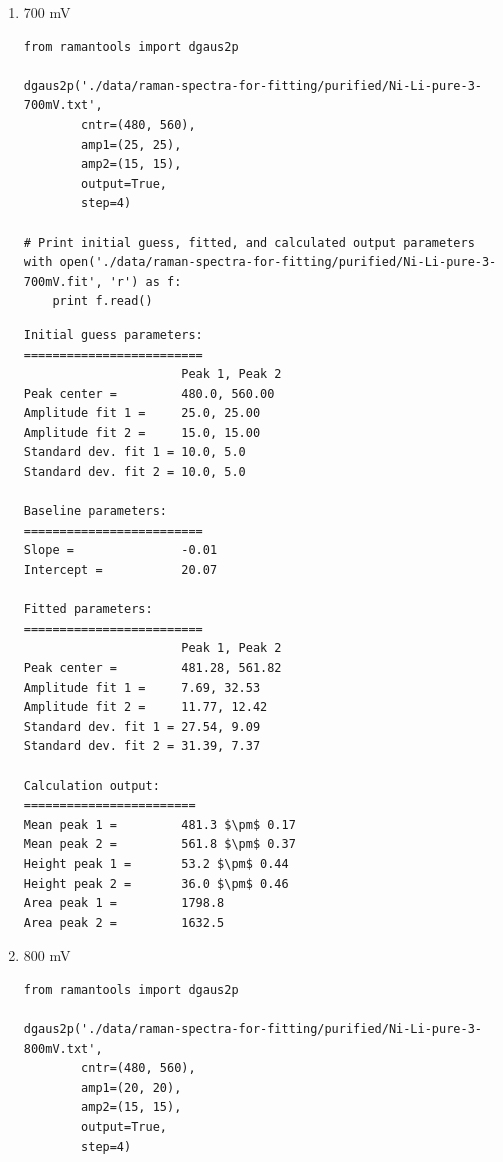 \documentclass[journal=jpccck,manuscript=suppinfo,email=true]{achemso}
\begin{document}
\begin{enumerate}
\begin{enumerate}
\begin{enumerate}
\begin{verbatim}
Calculation output:
========================
Mean peak 1 =         480.8 $\pm$ 0.18
Mean peak 2 =         561.6 $\pm$ 0.40
Height peak 1 =       49.0 $\pm$ 0.41
Height peak 2 =       32.9 $\pm$ 0.45
Area peak 1 =         1594.5
Area peak 2 =         1404.9
\end{verbatim}

\item 700 mV
\label{sec-4-1-0-1-3-2}
\begin{verbatim}
from ramantools import dgaus2p

dgaus2p('./data/raman-spectra-for-fitting/purified/Ni-Li-pure-3-700mV.txt',
        cntr=(480, 560),
        amp1=(25, 25),
        amp2=(15, 15),
        output=True,
        step=4)

# Print initial guess, fitted, and calculated output parameters
with open('./data/raman-spectra-for-fitting/purified/Ni-Li-pure-3-700mV.fit', 'r') as f:
    print f.read()
\end{verbatim}

\begin{verbatim}
Initial guess parameters:
=========================
                      Peak 1, Peak 2
Peak center =         480.0, 560.00
Amplitude fit 1 =     25.0, 25.00
Amplitude fit 2 =     15.0, 15.00
Standard dev. fit 1 = 10.0, 5.0
Standard dev. fit 2 = 10.0, 5.0

Baseline parameters:
=========================
Slope =               -0.01
Intercept =           20.07

Fitted parameters:
=========================
                      Peak 1, Peak 2
Peak center =         481.28, 561.82
Amplitude fit 1 =     7.69, 32.53
Amplitude fit 2 =     11.77, 12.42
Standard dev. fit 1 = 27.54, 9.09
Standard dev. fit 2 = 31.39, 7.37

Calculation output:
========================
Mean peak 1 =         481.3 $\pm$ 0.17
Mean peak 2 =         561.8 $\pm$ 0.37
Height peak 1 =       53.2 $\pm$ 0.44
Height peak 2 =       36.0 $\pm$ 0.46
Area peak 1 =         1798.8
Area peak 2 =         1632.5
\end{verbatim}

\item 800 mV
\label{sec-4-1-0-1-3-3}
\begin{verbatim}
from ramantools import dgaus2p

dgaus2p('./data/raman-spectra-for-fitting/purified/Ni-Li-pure-3-800mV.txt',
        cntr=(480, 560),
        amp1=(20, 20),
        amp2=(15, 15),
        output=True,
        step=4)


\end{verbatim}
\end{enumerate}
\end{enumerate}
\end{enumerate}
\end{document}
